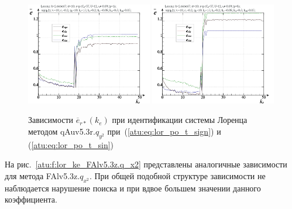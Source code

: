 \begin{figure}[h!]
  \centerline{
    \includegraphics[width=0.49\textwidth]{p/cha/lor/qAuv5.3r/lor_qAuv5_3r_qy2-p_k_e_e_sign.png}
    \hfill
    \includegraphics[width=0.49\textwidth]{p/cha/lor/qAuv5.3r/lor_qAuv5_3r_qy2-p_k_e_e_sin.png}
  }
  \caption{Зависимости $\overline{e}_{r*}(k_e)$ при идентификации системы Лоренца методом qAuv5.3r.$q_{y^2}$
   при~(\ref{atu:eq:lor_po_t_sign}) и (\ref{atu:eq:lor_po_t_sin})}
  \label{atu:f:lor_ke_qAuv5.3r.q_y2}
\end{figure}

На рис.~\ref{atu:f:lor_ke_FAlv5.3z.q_x2} представлены аналогичные зависимости
для метода  FAlv5.3z.$q_{x^2}$. При общей подобной структуре зависимости
не наблюдается нарушение поиска и при вдвое большем значении данного коэффициента.

